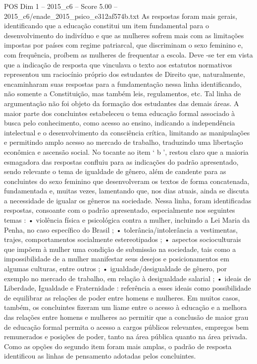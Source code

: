 \begin{textsample}{POS Dim 1 – 2015\_c6 – Score 5.00 – 2015\_c6/enade\_2015\_psico\_e312af574b.txt}
As respostas foram mais gerais, identificando que a educação constitui um item fundamental para o desenvolvimento do indivíduo e que as mulheres sofrem mais com as limitações impostas por países com regime patriarcal, que discriminam o sexo feminino e, com frequência, proíbem as mulheres de frequentar a escola.
Deve -se ter em vista que a indicação de resposta que vinculava o texto aos estatutos normativos representou um raciocínio próprio dos estudantes de Direito que, naturalmente, encaminharam suas respostas para a fundamentação nessa linha identificando, não somente a Constituição, mas também leis, regulamentos, etc.
Tal linha de argumentação não foi objeto da formação dos estudantes das demais áreas.
A maior parte dos concluintes estabeleceu o tema educação formal associado à busca pelo conhecimento, como acesso ao ensino, indicando a independência intelectual e o desenvolvimento da consciência crítica, limitando as manipulações e permitindo amplo acesso ao mercado de trabalho, traduzindo uma libertação econômica e ascensão social.
No tocante ao item ‘ b ’, restou claro que a maioria esmagadora das respostas confluiu para as indicações do padrão apresentado, sendo relevante o tema de igualdade de gênero, além de candente para as concluintes do sexo feminino que desenvolveram os textos de forma concatenada, fundamentada e, muitas vezes, lamentando que, nos dias atuais, ainda se discuta a necessidade de igualar os gêneros na sociedade.
Nessa linha, foram identificadas respostas, consoante com o padrão apresentado, especialmente nos seguintes temas : • violência física e psicológica contra a mulher, incluindo a Lei Maria da Penha, no caso específico do Brasil ; • tolerância/intolerância a vestimentas, trajes, comportamentos socialmente estereotipados ; • aspectos socioculturais que impõem à mulher uma condição de submissão na sociedade, tais como a impossibilidade de a mulher manifestar seus desejos e posicionamentos em algumas culturas, entre outros ; • igualdade/desigualdade de gênero, por exemplo no mercado de trabalho, em relação à desigualdade salarial ; • ideais de Liberdade, Igualdade e Fraternidade : referência a esses ideais como possibilidade de equilibrar as relações de poder entre homens e mulheres.
Em muitos casos, também, os concluintes fizeram um liame entre o acesso à educação e a melhora das relações entre homens e mulheres ao permitir que a conclusão de maior grau de educação formal permita o acesso a cargos públicos relevantes, empregos bem remunerados e posições de poder, tanto na área pública quanto na área privada.
Como as opções do segundo item foram mais amplas, o padrão de resposta identificou as linhas de pensamento adotadas pelos concluintes.

\end{textsample}
